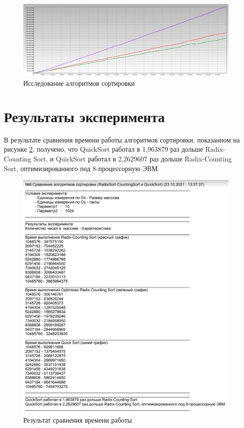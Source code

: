 \begin{figure}[H]
	\begin{center}
		\includegraphics[scale=0.2]{img/lab_03_06.jpg}
	\end{center}
	\captionsetup{justification=centering}
	\caption{Исследование алгоритмов сортировки}
	\label{img:sort}
\end{figure}

\section{Результаты эксперимента}

В результате сравнения времени работы алгоритмов сортировки, показанном на рисунке \ref{img:sort_result}, получено, что QuickSort работал в 1,963879 раз дольше Radix-Counting Sort, и 
QuickSort работал в 2,2629607 раз дольше Radix-Counting Sort, оптимизированного под 8-процессорную ЭВМ.

\begin{figure}[H]
	\begin{center}
		\includegraphics[scale=0.4]{img/sort_result.png}
	\end{center}
	\captionsetup{justification=centering}
	\caption{Результат сравнения времени работы}
	\label{img:sort_result}
\end{figure}

